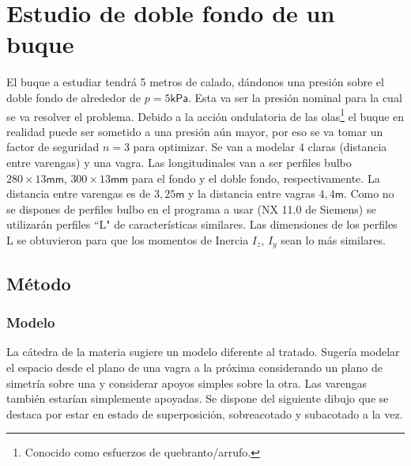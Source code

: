 \documentclass[onecolumn,10pt,titlepage]{article}
\newcommand{\unit}[1]{\textsf{#1}}
\newcommand{\milli}{\unit{m}}
\newcommand{\meter}{\unit{m}}
\newcommand{\pascal}{\unit{Pa}}
\newcommand{\kilo}{\unit{k}}
\newcommand{\si}[1]{#1}
\begin{document}
\clearpage
\section{Estudio de doble fondo de un buque}
El buque a estudiar tendrá 5 metros de calado, dándonos una presión sobre el doble fondo de alrededor de $p=5 \si{\kilo \pascal}$. Esta va ser la presión nominal para la cual se va resolver el problema. Debido a la acción ondulatoria de las olas\footnote{Conocido como esfuerzos de quebranto/arrufo.} el buque en realidad puede ser sometido a una presión aún mayor, por eso se va tomar un factor de seguridad $n=3$ para optimizar. Se van a modelar 4 claras (distancia entre varengas) y una vagra. Las longitudinales van a ser perfiles bulbo $280\times13\si{\milli \meter}$, $300\times 13 \si{\milli \meter}$ para el fondo y el doble fondo, respectivamente. La distancia entre varengas es de $3,25\si{\meter}$ y la distancia entre vagras $4,4\si{\meter}$. Como no se dispones de perfiles bulbo en el programa a usar (NX 11.0 de Siemens) se utilizarán perfiles ``L"{} de características similares. Las dimensiones de los perfiles L se obtuvieron para que los momentos de Inercia $I_z$, $I_y$ sean lo más similares. 


\subsection{Método}
\subsubsection*{Modelo}
La cátedra de la materia sugiere un modelo diferente al tratado. Sugería modelar el espacio desde el plano de una vagra a la próxima considerando un plano de simetría sobre una y considerar apoyos simples sobre la otra. Las varengas también estarían simplemente apoyadas. Se dispone del siguiente dibujo que se destaca por estar en estado de superposición, sobreacotado y subacotado a la vez.
\end{document}
